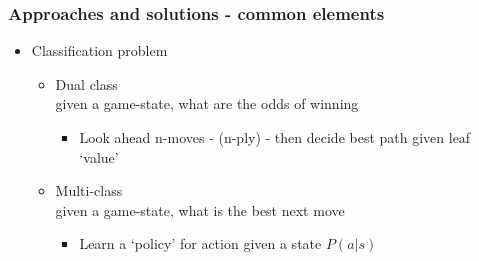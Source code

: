 \documentclass{beamer}
\begin{document}
\begin{frame}
\frametitle{Approaches and solutions - common elements}
\begin{itemize}
\item<1-> Classification problem
\begin{itemize}
\item<2,4> Dual class\\ \pause given a game-state, what are the odds of winning 
\begin{itemize}
\item<4> Look ahead n-moves - (n-ply) - then decide best path given leaf `value'
\end{itemize}
\item<3,5> Multi-class \\ \pause given a game-state, what is the best next move
\begin{itemize}
\item<5-> Learn a `policy' for action given a state $P(a | s)$
\end{itemize}
\end{itemize}
\end{itemize}

\end{frame}
\end{document}
